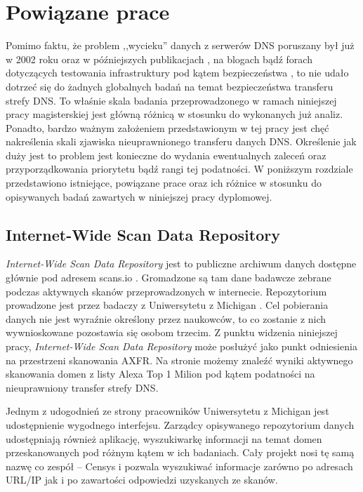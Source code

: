 \chapter{Powiązane prace}
Pomimo faktu, że problem ,,wycieku'' danych z serwerów DNS poruszany był już w 2002 roku \cite{uscert2} oraz w późniejszych
publikacjach \cite{uscert}, na blogach bądź forach dotyczących testowania infrastruktury pod kątem bezpieczeństwa
\cite{stackexchange, zonetransfer}, to nie udało dotrzeć
się do żadnych globalnych badań na temat bezpieczeństwa transferu strefy DNS. To właśnie skala badania przeprowadzonego w ramach
niniejszej pracy magisterskiej jest główną różnicą w stosunku do wykonanych już analiz. Ponadto, bardzo ważnym założeniem
przedstawionym w tej pracy jest chęć nakreślenia skali zjawiska nieuprawnionego transferu danych DNS. Określenie jak duży jest to
problem jest konieczne do wydania ewentualnych zaleceń oraz przyporządkowania priorytetu bądź rangi tej podatności. W poniższym
rozdziale przedstawiono istniejące, powiązane prace oraz ich różnice w stosunku do opisywanych badań zawartych w niniejszej pracy
dyplomowej.

\section{Internet-Wide Scan Data Repository}
\textit{Internet-Wide Scan Data Repository} jest to publiczne archiwum danych dostępne głównie pod adresem scans.io \cite{scans.io}.
Gromadzone są tam dane badawcze zebrane podczas aktywnych skanów przeprowadzonych w internecie. Repozytorium prowadzone jest przez
badaczy z Uniwersytetu z Michigan \cite{censys}. Cel pobierania danych nie jest wyraźnie określony przez naukowców, to co zostanie z
nich wywnioskowane pozostawia się osobom trzecim. Z punktu widzenia niniejszej pracy, \textit{Internet-Wide Scan Data Repository}
może posłużyć jako punkt odniesienia na przestrzeni skanowania AXFR. Na stronie możemy znaleźć wyniki aktywnego skanowania domen z
listy Alexa Top 1 Milion \cite{alexa} pod kątem podatności na nieuprawniony transfer strefy DNS.

Jednym z udogodnień ze strony pracowników Uniwersytetu z Michigan jest udostępnienie wygodnego interfejsu. Zarządcy
opisywanego repozytorium danych udostępniają również aplikację, wyszukiwarkę informacji na temat domen przeskanowanych pod różnym
kątem w ich badaniach. Cały projekt nosi tę samą nazwę co zespół -- Censys \cite{censys} i pozwala wyszukiwać informacje zarówno po
adresach URL/IP jak i po zawartości odpowiedzi uzyskanych ze skanów.

